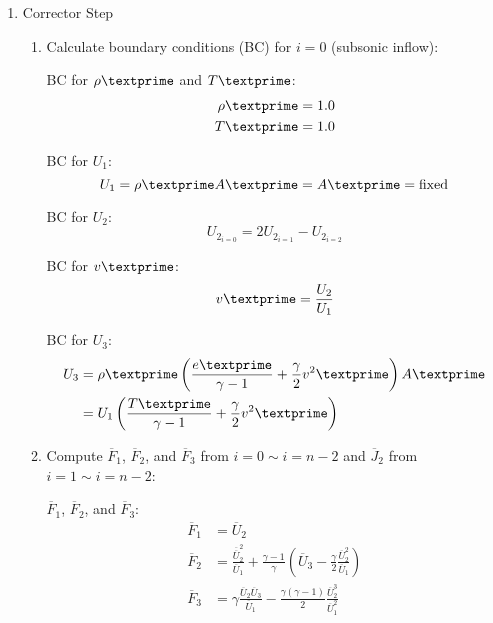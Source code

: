\documentclass[12pt]{article}
\begin{document}
\begin{enumerate}
\begin{enumerate}
\begin{enumerate}
		\end{enumerate}
		\item Corrector Step
		\begin{enumerate}
			\item Calculate boundary conditions (BC) for $i = 0$ (subsonic inflow):
				\par BC for $\rho\textprime$ and $T\textprime$:
				\begin{align}
					\rho\textprime	&= 1.0 \\
					T\textprime	&= 1.0
				\end{align}
				\par BC for $U_{1}$:
				\begin{equation}
					U_{1} = \rho\textprime A\textprime = A\textprime = \text{fixed}
				\end{equation}
				\par BC for $U_{2}$:
				\begin{equation}
					U_{2_{i=0}} = 2U_{2_{i=1}} - U_{2_{i=2}}
				\end{equation}
				\par BC for $v\textprime$:
				\begin{equation}
					v\textprime = \frac{U_{2}}{U_{1}}
				\end{equation}
				\par BC for $U_{3}$:
				\begin{align}
					U_{3} 	&= \rho\textprime\left(\frac{e\textprime}{\gamma - 1} + \frac{\gamma}{2}v^{2}\textprime\right)A\textprime \\
						&= U_{1}\left(\frac{T\textprime}{\gamma - 1} + \frac{\gamma}{2}v^{2}\textprime\right)
				\end{align}
			\item Compute $\overline{F}_1$, $\overline{F}_2$, and $\overline{F}_3$ from $i = 0 \sim i = n - 2$ and $\overline{J}_2$ from $i = 1 \sim i = n - 2$:
				\par $\overline{F}_{1}$, $\overline{F}_{2}$, and $\overline{F}_{3}$:
				\begin{align}
					\overline{F}_{1}	&= \overline{U}_{2} \\
					\overline{F}_{2}	&= \frac{\overline{\overline{U}}_{2}^{2}}{\overline{U}_{1}} + \frac{\gamma - 1}{\gamma}\left(\overline{U}_{3} - \frac{\gamma}{2}\frac{\overline{U}_{2}^{2}}{\overline{U}_{1}}\right) \\
					\overline{F}_{3}	&= \gamma\frac{\overline{U}_{2}\overline{U}_{3}}{\overline{U}_{1}} - \frac{\gamma\left(\gamma - 1\right)}{2}\frac{\overline{U}_{2}^{3}}{\overline{U}_{1}^{2}}

\end{align}
\end{enumerate}
\end{enumerate}
\end{enumerate}
\end{document}
